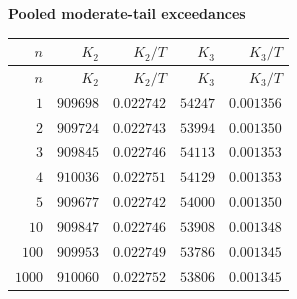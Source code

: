
\begingroup\small
\setlength{\tabcolsep}{4pt}
\noindent\textbf{Pooled moderate-tail exceedances}
\begin{longtable}{rrrrr}
\toprule
$n$ & $K_2$ & $K_2/T$ & $K_3$ & $K_3/T$ \\
\midrule
\endfirsthead
$n$ & $K_2$ & $K_2/T$ & $K_3$ & $K_3/T$ \\
\midrule
\endhead
\bottomrule
\endfoot
$1$ & $909698$ & $0.022742$ & $54247$ & $0.001356$ \\
$2$ & $909724$ & $0.022743$ & $53994$ & $0.001350$ \\
$3$ & $909845$ & $0.022746$ & $54113$ & $0.001353$ \\
$4$ & $910036$ & $0.022751$ & $54129$ & $0.001353$ \\
$5$ & $909677$ & $0.022742$ & $54000$ & $0.001350$ \\
$10$ & $909847$ & $0.022746$ & $53908$ & $0.001348$ \\
$100$ & $909953$ & $0.022749$ & $53786$ & $0.001345$ \\
$1000$ & $910060$ & $0.022752$ & $53806$ & $0.001345$ \\
\end{longtable}
\endgroup

